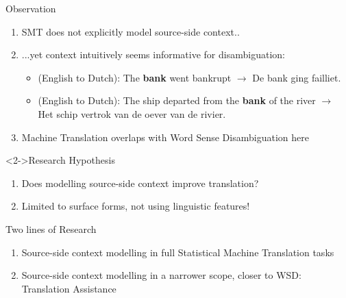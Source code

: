 \documentclass[compress]{beamer}
\begin{document}
\begin{frame}

  \begin{block}{Observation}
    \begin{enumerate}
      \item SMT does not explicitly model source-side context..
      \item ...yet context intuitively seems informative for disambiguation:
      \begin{itemize}
        \item (English to Dutch): The \textbf{bank} went bankrupt $\rightarrow$ De bank
          ging failliet.
        \item (English to Dutch): The ship departed from the \textbf{bank} of
          the river  $\rightarrow$ Het schip vertrok van de oever van de
          rivier.
      \end{itemize}
      \item Machine Translation overlaps with Word Sense Disambiguation here
    \end{enumerate}
  \end{block}

  \begin{block}<2->{Research Hypothesis}
    \begin{enumerate}[<+->]
      \item Does modelling source-side context improve translation?
      \item Limited to surface forms, not using linguistic features!
    \end{enumerate}
  \end{block}


\end{frame}


\begin{frame}
  \begin{block}{Two lines of Research}
    \begin{enumerate}
    \item Source-side context modelling in full Statistical Machine Translation tasks
    \item Source-side context modelling in a narrower scope, closer to WSD: Translation Assistance
    \end{enumerate}
  \end{block}
\end{frame}
\end{document}
